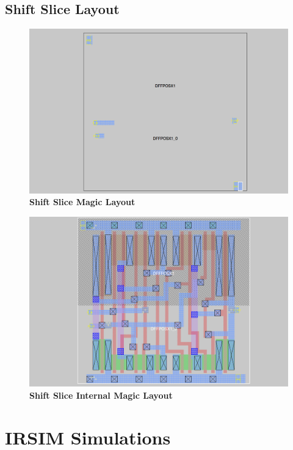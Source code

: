 \documentclass[a4paper]{article}
\begin{document}
\subsection{\textbf{Shift Slice Layout}}
    \begin{figure}[H]
        \centering
        \includegraphics[width=\textwidth,height=\textheight,keepaspectratio]{../../magic/pics/shift_slice.png}
        \caption{\textbf{Shift Slice Magic Layout}}
        \label{fig:gg}
    \end{figure}
    \begin{figure}[H]
        \centering
        \includegraphics[width=\textwidth,height=\textheight,keepaspectratio]{../../magic/pics/shift_slice_internal.png}
        \caption{\textbf{Shift Slice Internal Magic Layout}}
        \label{fig:gg}
    \end{figure}

\section{\textbf{IRSIM Simulations}}
\end{document}
